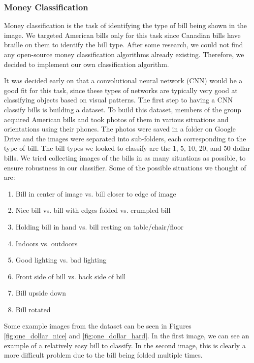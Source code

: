 \documentclass[a4paper,11pt]{article}
\begin{document}
\subsubsection{Money Classification}
Money classification is the task of identifying the type of bill being shown in the image. We targeted American bills only for this task since Canadian bills have braille on them to identify the bill type. After some research, we could not find any open-source money classification algorithms already existing. Therefore, we decided to implement our own classification algorithm.

It was decided early on that a convolutional neural network (CNN) would be a good fit for this task, since these types of networks are typically very good at classifying objects based on visual patterns. The first step to having a CNN classify bills is building a dataset. To build this dataset, members of the group acquired American bills and took photos of them in various situations and orientations using their phones. The photos were saved in a folder on Google Drive and the images were separated into sub-folders, each corresponding to the type of bill. The bill types we looked to classify are the 1, 5, 10, 20, and 50 dollar bills. We tried collecting images of the bills in as many situations as possible, to ensure robustness in our classifier. Some of the possible situations we thought of are:

\begin{enumerate}
    \item Bill in center of image vs. bill closer to edge of image
    \item Nice bill vs. bill with edges folded vs. crumpled bill
    \item Holding bill in hand vs. bill resting on table/chair/floor
    \item Indoors vs. outdoors
    \item Good lighting vs. bad lighting
    \item Front side of bill vs. back side of bill
    \item Bill upside down
    \item Bill rotated
\end{enumerate}

Some example images from the dataset can be seen in Figures \ref{fig:one_dollar_nice} and \ref{fig:one_dollar_hard}. In the first image, we can see an example of a relatively easy bill to classify. In the second image, this is clearly a more difficult problem due to the bill being folded multiple times.
\end{document}
